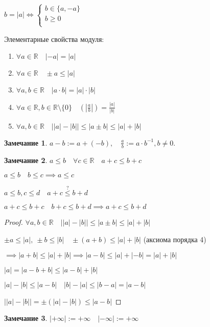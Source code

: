 \documentclass{book}
\newcommand\R{\ensuremath{\mathbb{R}}}
\theoremstyle{definition}
\newtheorem*{note}{Замечание}
\begin{document}
    \begin{property}
        $b=|a| \iff  
        \begin{cases}
            b\in \{a, -a\}\\
            b\geqslant 0\\
        \end{cases}$
    \end{property}

    Элементарные свойства модуля:
    \begin{enumerate}
        \item $\forall a\in \R\quad |-a| =|a|$
        \item $\forall a\in \R\quad \pm a \leqslant  |a|$
        \item $\forall  a, b\in \R\quad |a\cdot b| = |a|\cdot |b|$
        \item $\forall a\in \R, b\in \R\setminus \{0\}\quad(\left| \frac{a}{b} \right| ) = \frac{|a|}{|b|}$
        \item $\forall a, b\in \R\quad \left| |a| - |b| \right| \leqslant |a\pm b| \leqslant |a|+|b|$
    \end{enumerate}
    \begin{note}
        $a-b := a+(-b),\quad \frac{a}{b}:= a\cdot b^{-1}, b\neq 0$.
    \end{note}
    \begin{note}
        $a\leqslant b\quad\forall c\in \R\quad a+c\leqslant b+c$

        $a\leqslant b\quad b\leqslant c \implies a\leqslant c$

        $a\leqslant b, c\leqslant d\quad a+c\overset{?}{\leqslant} b+d$

        $a+c\leqslant b+c\quad b+c\leqslant b+d \implies a+c\leqslant b+d$
    \end{note}
    \begin{proof}
        $\forall a, b\in \R\quad \left| |a| - |b| \right| \leqslant |a\pm b| \leqslant |a|+|b|$

        $\pm a\leqslant |a|,\ \pm b\leqslant |b|\quad \pm(a+b)\leqslant |a| + |b| $ (аксиома порядка 4)

        $\implies |a+b|\leqslant |a| + |b| \implies |a-b|\leqslant |a| + |-b| = |a| + |b|$

        $|a| = |a-b+b| \leqslant |a-b| + |b|$

        $|a| - |b|\leqslant |a-b|\quad |b| - |a| \leqslant |b-a| = |a-b|$

        $\left| |a| - |b| \right| =  \pm (|a| - |b|) \leqslant |a-b|$
    \end{proof}
    \begin{note}
        $|+\infty | := +\infty \quad |-\infty | := +\infty $
    \end{note}
\end{document}
